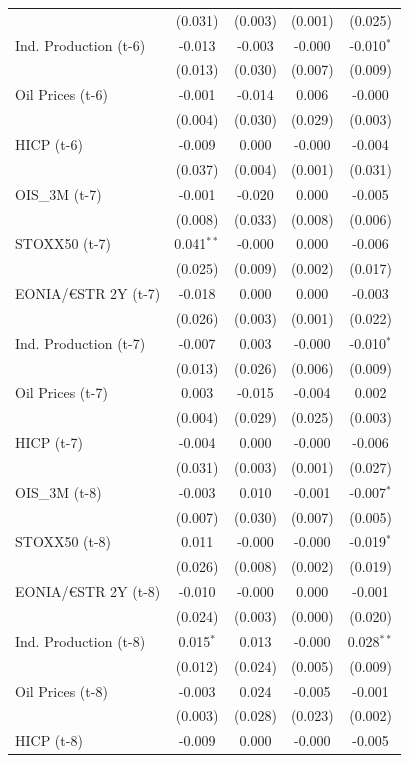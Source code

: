 \begin{longtable}[t]{lcccc}
 & (0.031) & (0.003) & (0.001) & (0.025)\\
Ind. Production (t-6) & -0.013 & -0.003 & -0.000 & -0.010$^{*}$\\
 & (0.013) & (0.030) & (0.007) & (0.009)\\
Oil Prices (t-6) & -0.001 & -0.014 & 0.006 & -0.000\\
 & (0.004) & (0.030) & (0.029) & (0.003)\\
HICP (t-6) & -0.009 & 0.000 & -0.000 & -0.004\\
 & (0.037) & (0.004) & (0.001) & (0.031)\\
OIS\_3M (t-7) & -0.001 & -0.020 & 0.000 & -0.005\\
 & (0.008) & (0.033) & (0.008) & (0.006)\\
STOXX50 (t-7) & 0.041$^{**}$ & -0.000 & 0.000 & -0.006\\
 & (0.025) & (0.009) & (0.002) & (0.017)\\
EONIA/€STR 2Y (t-7) & -0.018 & 0.000 & 0.000 & -0.003\\
 & (0.026) & (0.003) & (0.001) & (0.022)\\
Ind. Production (t-7) & -0.007 & 0.003 & -0.000 & -0.010$^{*}$\\
 & (0.013) & (0.026) & (0.006) & (0.009)\\
Oil Prices (t-7) & 0.003 & -0.015 & -0.004 & 0.002\\
 & (0.004) & (0.029) & (0.025) & (0.003)\\
HICP (t-7) & -0.004 & 0.000 & -0.000 & -0.006\\
 & (0.031) & (0.003) & (0.001) & (0.027)\\
OIS\_3M (t-8) & -0.003 & 0.010 & -0.001 & -0.007$^{*}$\\
 & (0.007) & (0.030) & (0.007) & (0.005)\\
STOXX50 (t-8) & 0.011 & -0.000 & -0.000 & -0.019$^{*}$\\
 & (0.026) & (0.008) & (0.002) & (0.019)\\
EONIA/€STR 2Y (t-8) & -0.010 & -0.000 & 0.000 & -0.001\\
 & (0.024) & (0.003) & (0.000) & (0.020)\\
Ind. Production (t-8) & 0.015$^{*}$ & 0.013 & -0.000 & 0.028$^{**}$\\
 & (0.012) & (0.024) & (0.005) & (0.009)\\
Oil Prices (t-8) & -0.003 & 0.024 & -0.005 & -0.001\\
 & (0.003) & (0.028) & (0.023) & (0.002)\\
HICP (t-8) & -0.009 & 0.000 & -0.000 & -0.005\\

\end{longtable}
